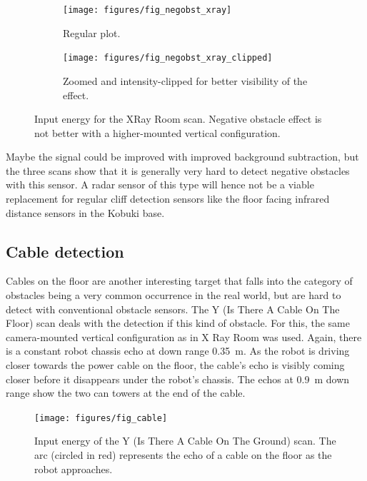 \begin{figure}[htbp]
    \centering
    \begin{subfigure}[t]{.475\textwidth}
        \texttt{[image: figures/fig\_negobst\_xray]}
        \caption{Regular plot.}
        \label{fig:negobst_xray}
    \end{subfigure}%
    \hfill%
    \begin{subfigure}[t]{.475\textwidth}
        \texttt{[image: figures/fig\_negobst\_xray\_clipped]}
        \caption{Zoomed and intensity-clipped for better visibility of the effect.}
        \label{fig:negobst_xray_clipped}
    \end{subfigure}
    \caption{Input energy for the XRay Room scan. Negative obstacle effect is not better with a higher-mounted vertical configuration.}
\end{figure}


Maybe the signal could be improved with improved background subtraction, but the three scans show that it is generally very hard to
detect negative obstacles with this sensor. A radar sensor of this type
will hence not be a viable replacement for regular cliff detection
sensors like the floor facing infrared distance sensors in the Kobuki
base.

\subsection{Cable detection}\label{cable-detection}

Cables on the floor are another interesting target that falls into the
category of obstacles being a very common occurrence in the real world,
but are hard to detect with conventional obstacle sensors. The Y (Is
There A Cable On The Floor) scan deals with the detection if this kind
of obstacle. For this, the same camera-mounted vertical configuration as
in X Ray Room was used. Again, there is a constant robot chassis echo at
down range \SI{0.35}{m}. As the robot is driving closer towards the power cable
on the floor, the cable's echo is visibly coming closer before it
disappears under the robot's chassis. The echos at \SI{0.9}{m} down range show
the two can towers at the end of the cable.

\begin{figure}[htp]
    \centering
    \texttt{[image: figures/fig\_cable]}
    \caption{Input energy of the Y (Is There A Cable On The Ground) scan. The arc (circled in red) represents the echo of a cable on the floor as the robot approaches.}
    \label{fig:cable}
\end{figure}

